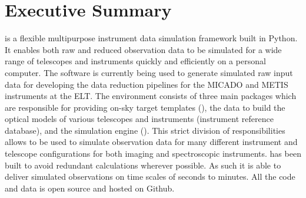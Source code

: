 \section{Executive Summary}
\label{sec:summary}

\ScopeSim{} is a flexible multipurpose instrument data simulation
framework built in Python.  It enables both raw and reduced
observation data to be simulated for a wide range of telescopes and
instruments quickly and efficiently on a personal computer.  The
software is currently being used to generate simulated raw input data
for developing the data reduction pipelines for the MICADO and METIS
instruments at the ELT.  The \ScopeSim{} environment consists of three
main packages which are responsible for providing on-sky target
templates (\ScopeSimtemplates{}), the data to build the optical models
of various telescopes and instruments (instrument reference database),
and the simulation engine (\ScopeSim{}).  This strict division of
responsibilities allows \ScopeSim{} to be used to simulate observation
data for many different instrument and telescope configurations for
both imaging and spectroscopic instruments.  \ScopeSim{} has been
built to avoid redundant calculations wherever possible.  As such it
is able to deliver simulated observations on time scales of seconds to
minutes.  All the code and data is open source and hosted on Github.

